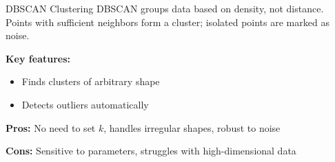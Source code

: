 \documentclass[aspectratio=169, table]{beamer}
\begin{document}
\begin{frame}{DBSCAN Clustering}
	DBSCAN groups data based on density, not distance. Points with sufficient neighbors form a cluster; isolated points are marked as noise.
	
	\textbf{Key features:}
	\begin{itemize}
		\item Finds clusters of arbitrary shape
		\item Detects outliers automatically
	\end{itemize}
	
	\textbf{Pros:} No need to set \(k\), handles irregular shapes, robust to noise
	 
	\textbf{Cons:} Sensitive to parameters, struggles with high-dimensional data
\end{frame}
\end{document}
